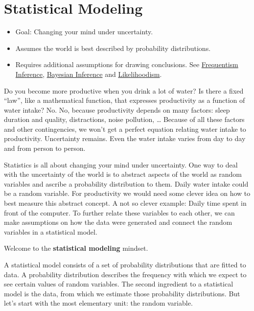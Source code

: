 \documentclass[
  10pt,
]{scrbook}
\providecommand{\tightlist}{%
  \setlength{\itemsep}{0pt}\setlength{\parskip}{0pt}}
\begin{document}
\hypertarget{statistical-modeling}{%
\chapter{Statistical Modeling}\label{statistical-modeling}}

\begin{itemize}
\tightlist
\item
  Goal: Changing your mind under uncertainty.
\item
  Assumes the world is best described by probability distributions.
\item
  Requires additional assumptions for drawing conclusions. See \protect\hyperlink{frequentist-inference}{Frequentism Inference}, \protect\hyperlink{bayesian-inference}{Bayesian Inference} and \protect\hyperlink{likelihoodism}{Likelihoodism}.
\end{itemize}

Do you become more productive when you drink a lot of water?
Is there a fixed ``law'', like a mathematical function, that expresses productivity as a function of water intake?
No.
No, because productivity depends on many factors: sleep duration and quality, distractions, noise pollution, \ldots{}
Because of all these factors and other contingencies, we won't get a perfect equation relating water intake to productivity.
Uncertainty remains.
Even the water intake varies from day to day and from person to person.

Statistics is all about changing your mind under uncertainty.
One way to deal with the uncertainty of the world is to abstract aspects of the world as random variables and ascribe a probability distribution to them.
Daily water intake could be a random variable.
For productivity we would need some clever idea on how to best measure this abstract concept.
A not so clever example: Daily time spent in front of the computer.
To further relate these variables to each other, we can make assumptions on how the data were generated and connect the random variables in a statistical model.

Welcome to the \textbf{statistical modeling} mindset.

A statistical model consists of a set of probability distributions that are fitted to data.
A probability distribution describes the frequency with which we expect to see certain values of random variables.
The second ingredient to a statistical model is the data, from which we estimate those probability distributions.
But let's start with the most elementary unit: the random variable.
\end{document}
